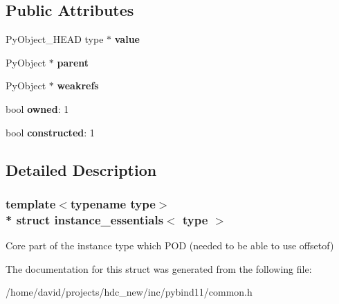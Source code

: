 \subsection*{Public Attributes}
\begin{DoxyCompactItemize}
\item 
Py\+Object\+\_\+\+H\+E\+AD type $\ast$ {\bfseries value}\hypertarget{structinstance__essentials_a5ea0becdb59e82ed7f9cfaf5671c6554}{}\label{structinstance__essentials_a5ea0becdb59e82ed7f9cfaf5671c6554}

\item 
Py\+Object $\ast$ {\bfseries parent}\hypertarget{structinstance__essentials_a770becd085abcdac9d4ed5ae6ebd5366}{}\label{structinstance__essentials_a770becd085abcdac9d4ed5ae6ebd5366}

\item 
Py\+Object $\ast$ {\bfseries weakrefs}\hypertarget{structinstance__essentials_a194ca355107db5fcf44e3eaab8b669d6}{}\label{structinstance__essentials_a194ca355107db5fcf44e3eaab8b669d6}

\item 
bool {\bfseries owned}\+: 1\hypertarget{structinstance__essentials_aa2516bb9705963341085e1a4fba9d539}{}\label{structinstance__essentials_aa2516bb9705963341085e1a4fba9d539}

\item 
bool {\bfseries constructed}\+: 1\hypertarget{structinstance__essentials_ad55cf4a7fee7751390e9a34b40556119}{}\label{structinstance__essentials_ad55cf4a7fee7751390e9a34b40556119}

\end{DoxyCompactItemize}


\subsection{Detailed Description}
\subsubsection*{template$<$typename type$>$\\*
struct instance\+\_\+essentials$<$ type $>$}

Core part of the \textquotesingle{}instance\textquotesingle{} type which P\+OD (needed to be able to use \textquotesingle{}offsetof\textquotesingle{}) 

The documentation for this struct was generated from the following file\+:\begin{DoxyCompactItemize}
\item 
/home/david/projects/hdc\+\_\+new/inc/pybind11/common.\+h\end{DoxyCompactItemize}
